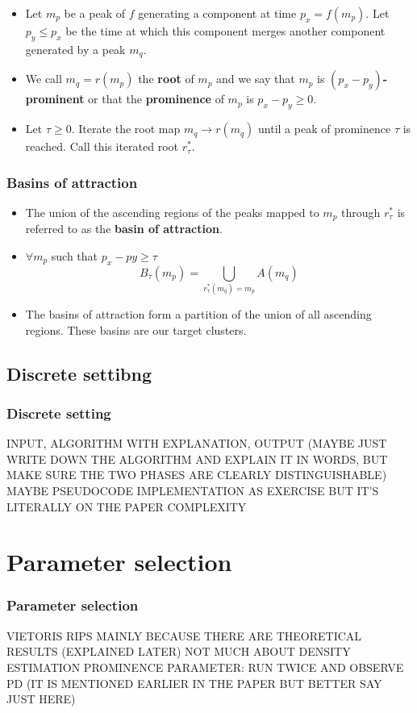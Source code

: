 \documentclass{beamer}
\theoremstyle{definition}
\begin{document}
\begin{frame}
\begin{itemize}
\item<1-> Let $m_p$ be a peak of $f$ generating a component at time $p_x=f(m_p)$. Let $p_y\leq p_x$ be the time at which this component merges another component generated by a peak $m_q$. %
\item<2->We call $m_q=r(m_p)$ the \textbf{root} of $m_p$ and we say that $m_p$ is \textbf{$(p_x-p_y)$-prominent} or that the \textbf{prominence} of $m_p$ is $p_x-p_y\geq 0$.
\item<3-> Let $\tau\geq 0$. Iterate the root map $m_q\to r(m_q)$ until a peak of prominence $\tau$ is reached. Call this iterated root $r^*_\tau$.
\end{itemize}
\end{frame}
\begin{frame}
\frametitle{Basins of attraction}
\begin{itemize}
\item<1-> The union of the ascending regions of the peaks mapped to $m_p$ through $r^*_\tau$ is referred to as the \textbf{basin of attraction}.
\item<2-> $\forall m_p$ such that $p_x - py \geq\tau$
\[B_\tau(m_p)=\bigcup_{r^*_\tau(m_q)=m_p} A(m_q)\]
\item<3->[]The basins of attraction form a partition of the union of all ascending
regions. These basins are our target clusters.
\end{itemize}

\end{frame}

\subsection{Discrete settibng}
\begin{frame}
\frametitle{Discrete setting}
INPUT, ALGORITHM WITH EXPLANATION, OUTPUT (MAYBE JUST WRITE DOWN THE ALGORITHM AND EXPLAIN IT IN WORDS, BUT MAKE SURE THE TWO PHASES ARE CLEARLY DISTINGUISHABLE) MAYBE PSEUDOCODE IMPLEMENTATION AS EXERCISE BUT IT'S LITERALLY ON THE PAPER
COMPLEXITY
\end{frame}

\section{Parameter selection}
\begin{frame}
\frametitle{Parameter selection}
VIETORIS RIPS MAINLY BECAUSE THERE ARE THEORETICAL RESULTS (EXPLAINED LATER)
NOT MUCH ABOUT DENSITY ESTIMATION
PROMINENCE PARAMETER: RUN TWICE AND OBSERVE PD (IT IS MENTIONED EARLIER IN THE PAPER BUT BETTER SAY JUST HERE)
\end{frame}
\end{document}
